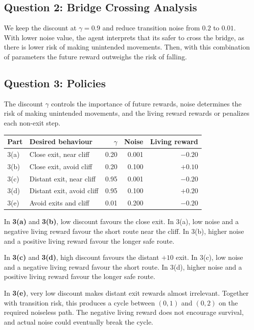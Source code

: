 \documentclass[11pt,a4paper]{article}
\begin{document}
\subsection{Question 2: Bridge Crossing Analysis}
We keep the discount at $\gamma=0.9$ and reduce transition noise from $0.2$ to $0.01$. With lower noise value, the agent interprets that its safer to cross the bridge, as there is lower risk of making unintended movements. Then, with this combination of parameters the future reward outweighs the risk of falling.

\subsection{Question 3: Policies}
The discount $\gamma$ controls the importance of future rewards,
noise determines the risk of making unintended movements, and the living
reward rewards or penalizes each non-exit step.

\begin{center}
\begin{tabular}{llrrr}
\toprule
Part & Desired behaviour & $\gamma$ & Noise & Living reward\\
\midrule
3(a) & Close exit, near cliff & 0.20 & 0.001 & $-0.20$\\
3(b) & Close exit, avoid cliff & 0.20 & 0.100 & $+0.10$\\
3(c) & Distant exit, near cliff & 0.95 & 0.001 & $-0.20$\\
3(d) & Distant exit, avoid cliff & 0.95 & 0.100 & $+0.20$\\
3(e) & Avoid exits and cliff & 0.01 & 0.200 & $-0.20$\\
\bottomrule
\end{tabular}
\end{center}

In \textbf{3(a)} and \textbf{3(b)}, low discount favours the close
exit. In 3(a), low noise and a negative living reward favour the
short route near the cliff. In 3(b), higher noise and a positive
living reward favour the longer safe route.

In \textbf{3(c)} and \textbf{3(d)}, high discount favours the distant
$+10$ exit. In 3(c), low noise and a negative living reward favour
the short route. In 3(d), higher noise and a positive living reward
favour the longer safe route.

In \textbf{3(e)}, very low discount makes distant exit rewards
almost irrelevant. Together with transition risk, this produces
a cycle between $(0,1)$ and $(0,2)$ on the required noiseless path.
The negative living reward does not encourage survival, and
actual noise could eventually break the cycle.
\end{document}

